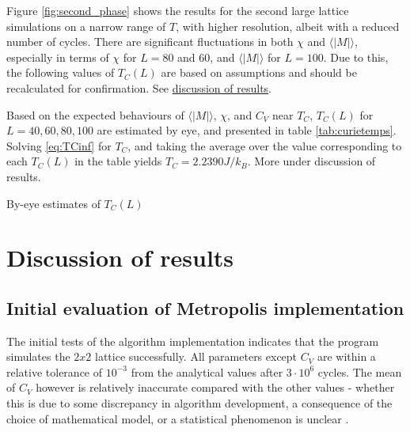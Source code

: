 \documentclass[%
oneside,                 %
final,                   %
10pt]{article}
\begin{document}
Figure \ref{fig:second_phase} shows the results for the second large lattice simulations on a narrow range of $T$, with higher resolution, albeit with a reduced number of cycles. There are significant fluctuations in both $\chi$ and $\langle | M| \rangle$, especially in terms of $\chi$ for $L=80$ and $60$, and $\langle |M| \rangle$ for $L=100$. Due to this, the following values of $T_C(L)$ are based on assumptions and should be recalculated for confirmation. See \hyperref[DR.est.curie]{discussion of results}. \newline

Based on the expected behaviours of $\langle | M | \rangle$, $\chi$, and $C_V$ near $T_C$, $T_C(L)$ for $L=40,60,80,100$ are estimated by eye, and presented in table \ref{tab:curietemps}. Solving \eqref{eq:TCinf} for $T_C$, and taking the average over the value corresponding to each $T_C(L)$ in the table yields $T_C=2.2390 J/k_B$. More under discussion of results.

\begin{table}[h!tb]
    \centering
    \caption{By-eye estimates of $T_C(L)$}
\label{tab:curietemps}
\end{table}


\section{Discussion of results}
\subsection{Initial evaluation of Metropolis implementation}
\label{SS:Disucssion_init_eval}
The initial tests of the algorithm implementation indicates that the program simulates the $2x2$ lattice successfully. All parameters except $C_V$ are within a relative tolerance of $10^{-3}$ from the analytical values after $3 \cdot 10^6$ cycles. The mean of $C_V$ however is relatively inaccurate compared with the other values - whether this is due to some discrepancy in algorithm development, a consequence of the choice of mathematical model, or a statistical phenomenon is unclear . \newline
\end{document}
